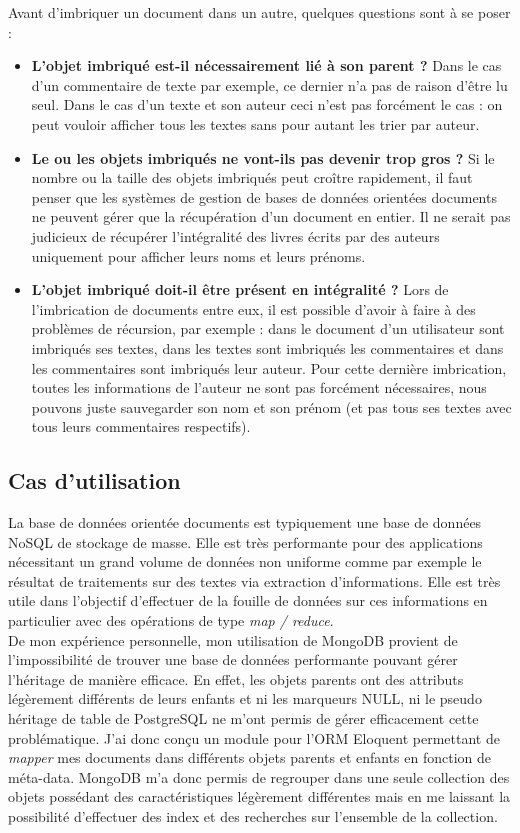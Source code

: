   Avant d'imbriquer un document dans un autre, quelques questions sont à se poser :
  \vspace{10px}
  \begin{itemize}
    \item \textbf{L'objet imbriqué est-il nécessairement lié à son parent ?} Dans le cas d'un commentaire de texte par exemple, ce dernier n'a pas de raison d'être lu seul. Dans le cas d'un texte et son auteur ceci n'est pas forcément le cas : on peut vouloir afficher tous les textes sans pour autant les trier par auteur.
    \item \textbf{Le ou les objets imbriqués ne vont-ils pas devenir trop gros ?} Si le nombre ou la taille des objets imbriqués peut croître rapidement, il faut penser que les systèmes de gestion de bases de données orientées documents ne peuvent gérer que la récupération d'un document en entier. Il ne serait pas judicieux de récupérer l'intégralité des livres écrits par des auteurs uniquement pour afficher leurs noms et leurs prénoms.
    \item \textbf{L'objet imbriqué doit-il être présent en intégralité ?} Lors de l'imbrication de documents entre eux, il est possible d'avoir à faire à des problèmes de récursion, par exemple : dans le document d'un utilisateur sont imbriqués ses textes, dans les textes sont imbriqués les commentaires et dans les commentaires sont imbriqués leur auteur. Pour cette dernière imbrication, toutes les informations de l'auteur ne sont pas forcément nécessaires, nous pouvons juste sauvegarder son nom et son prénom (et pas tous ses textes avec tous leurs commentaires respectifs).
  \end{itemize}

\subsection{Cas d'utilisation}

  La base de données orientée documents est typiquement une base de données NoSQL de stockage de masse. Elle est très performante pour des applications nécessitant un grand volume de données non uniforme comme par exemple le résultat de traitements sur des textes via extraction d'informations. Elle est très utile dans l'objectif d'effectuer de la fouille de données sur ces informations en particulier avec des opérations de type \textit{map / reduce}.\\

  De mon expérience personnelle, mon utilisation de MongoDB provient de l'impossibilité de trouver une base de données performante pouvant gérer l'héritage de manière efficace. En effet, les objets parents ont des attributs légèrement différents de leurs enfants et ni les marqueurs NULL, ni le pseudo héritage de table de PostgreSQL ne m'ont permis de gérer efficacement cette problématique. J'ai donc conçu un module pour l'ORM Eloquent permettant de \textit{mapper} mes documents dans différents objets parents et enfants en fonction de méta-data. MongoDB m'a donc permis de regrouper dans une seule collection des objets possédant des caractéristiques légèrement différentes mais en me laissant la possibilité d'effectuer des index et des recherches sur l'ensemble de la collection.

